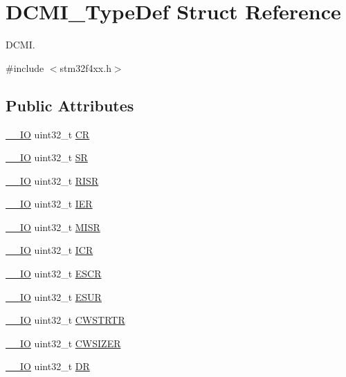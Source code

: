 \hypertarget{struct_d_c_m_i___type_def}{}\section{D\+C\+M\+I\+\_\+\+Type\+Def Struct Reference}
\label{struct_d_c_m_i___type_def}


D\+C\+MI.  




{\ttfamily \#include $<$stm32f4xx.\+h$>$}

\subsection*{Public Attributes}
\begin{DoxyCompactItemize}
\item 
\hyperlink{core__cm4_8h_aec43007d9998a0a0e01faede4133d6be}{\+\_\+\+\_\+\+IO} uint32\+\_\+t \hyperlink{struct_d_c_m_i___type_def_a3cfcc9860ca551cbcb10c1c3dd4304f0}{CR}
\item 
\hyperlink{core__cm4_8h_aec43007d9998a0a0e01faede4133d6be}{\+\_\+\+\_\+\+IO} uint32\+\_\+t \hyperlink{struct_d_c_m_i___type_def_a1bbe4b3cc5d9552526bec462b42164d5}{SR}
\item 
\hyperlink{core__cm4_8h_aec43007d9998a0a0e01faede4133d6be}{\+\_\+\+\_\+\+IO} uint32\+\_\+t \hyperlink{struct_d_c_m_i___type_def_ae0aba9f38498cccbe0186b7813825026}{R\+I\+SR}
\item 
\hyperlink{core__cm4_8h_aec43007d9998a0a0e01faede4133d6be}{\+\_\+\+\_\+\+IO} uint32\+\_\+t \hyperlink{struct_d_c_m_i___type_def_a91ce93b57d8382147574c678ee497c63}{I\+ER}
\item 
\hyperlink{core__cm4_8h_aec43007d9998a0a0e01faede4133d6be}{\+\_\+\+\_\+\+IO} uint32\+\_\+t \hyperlink{struct_d_c_m_i___type_def_ab367c4ca2e8ac87238692e6d55d622ec}{M\+I\+SR}
\item 
\hyperlink{core__cm4_8h_aec43007d9998a0a0e01faede4133d6be}{\+\_\+\+\_\+\+IO} uint32\+\_\+t \hyperlink{struct_d_c_m_i___type_def_a0371fc07916e3043e1151eaa97e172c9}{I\+CR}
\item 
\hyperlink{core__cm4_8h_aec43007d9998a0a0e01faede4133d6be}{\+\_\+\+\_\+\+IO} uint32\+\_\+t \hyperlink{struct_d_c_m_i___type_def_a52c16b920a3f25fda961d0cd29749433}{E\+S\+CR}
\item 
\hyperlink{core__cm4_8h_aec43007d9998a0a0e01faede4133d6be}{\+\_\+\+\_\+\+IO} uint32\+\_\+t \hyperlink{struct_d_c_m_i___type_def_af00a94620e33f4eff74430ff25c12b94}{E\+S\+UR}
\item 
\hyperlink{core__cm4_8h_aec43007d9998a0a0e01faede4133d6be}{\+\_\+\+\_\+\+IO} uint32\+\_\+t \hyperlink{struct_d_c_m_i___type_def_a4d58830323e567117c12ae3feac613b9}{C\+W\+S\+T\+R\+TR}
\item 
\hyperlink{core__cm4_8h_aec43007d9998a0a0e01faede4133d6be}{\+\_\+\+\_\+\+IO} uint32\+\_\+t \hyperlink{struct_d_c_m_i___type_def_a1b9c8048339e19b110ecfbea486f55df}{C\+W\+S\+I\+Z\+ER}
\item 
\hyperlink{core__cm4_8h_aec43007d9998a0a0e01faede4133d6be}{\+\_\+\+\_\+\+IO} uint32\+\_\+t \hyperlink{struct_d_c_m_i___type_def_a266cec1031b0be730b0e35523f5e2934}{DR}
\end{DoxyCompactItemize}


